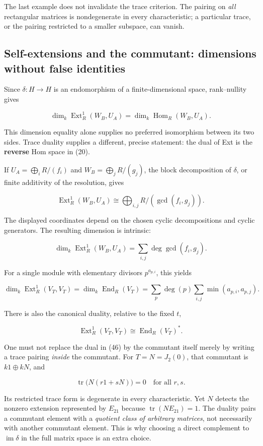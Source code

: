 \documentclass[
  11pt,
]{article}
\begin{document}
The last example does not invalidate the trace criterion. The pairing on
\emph{all} rectangular matrices is nondegenerate in every
characteristic; a particular trace, or the pairing restricted to a
smaller subspace, can vanish.

\subsection{Self-extensions and the commutant: dimensions without false
identities}\label{self-extensions-and-the-commutant-dimensions-without-false-identities}

Since \(\delta:H\to H\) is an endomorphism of a finite-dimensional
space, rank--nullity gives

\[\dim_k\operatorname{Ext}^1_R(W_B,U_A)
=\dim_k\operatorname{Hom}_R(W_B,U_A).\tag{42}\]

This dimension equality alone supplies no preferred isomorphism between
its two sides. Trace duality supplies a different, precise statement:
the dual of Ext is the \textbf{reverse} Hom space in (20).

If \(U_A=\bigoplus_iR/(f_i)\) and \(W_B=\bigoplus_jR/(g_j)\), the block
decomposition of \(\delta\), or finite additivity of the resolution,
gives

\[\operatorname{Ext}^1_R(W_B,U_A)
\cong\bigoplus_{i,j}R/(\gcd(f_i,g_j)).\tag{43}\]

The displayed coordinates depend on the chosen cyclic decompositions and
cyclic generators. The resulting dimension is intrinsic:

\[\dim_k\operatorname{Ext}^1_R(W_B,U_A)
=\sum_{i,j}\deg\gcd(f_i,g_j).\tag{44}\]

For a single module with elementary divisors \(p^{a_{p,i}}\), this
yields

\[\dim_k\operatorname{Ext}^1_R(V_T,V_T)
=\dim_k\operatorname{End}_R(V_T)
=\sum_p\deg(p)\sum_{i,j}\min(a_{p,i},a_{p,j}).\tag{45}\]

There is also the canonical duality, relative to the fixed \(t\),

\[\operatorname{Ext}^1_R(V_T,V_T)
\cong\operatorname{End}_R(V_T)^*.\tag{46}\]

One must not replace the dual in (46) by the commutant itself merely by
writing a trace pairing \emph{inside} the commutant. For \(T=N=J_2(0)\),
that commutant is \(k1\oplus kN\), and

\[\operatorname{tr}\bigl(N(r1+sN)\bigr)=0\quad\text{for all }r,s.\]

Its restricted trace form is degenerate in every characteristic. Yet
\(N\) detects the nonzero extension represented by \(E_{21}\) because
\(\operatorname{tr}(NE_{21})=1\). The duality pairs a commutant element
with a \emph{quotient class of arbitrary matrices}, not necessarily with
another commutant element. This is why choosing a direct complement to
\(\operatorname{im}\delta\) in the full matrix space is an extra choice.
\end{document}

